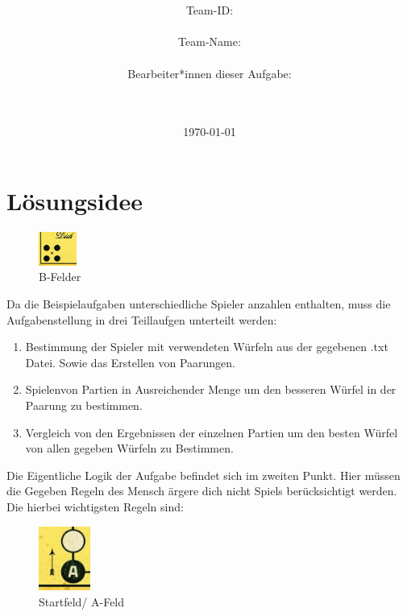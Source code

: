 \documentclass[a4paper,11pt,ngerman]{scrartcl}
\title{\textbf{\Huge\Aufgabe}}
\author{\LARGE Team-ID: \LARGE \TeamId \\\\
	    \LARGE Team-Name: \LARGE \TeamName \\\\
	    \LARGE Bearbeiter*innen dieser Aufgabe: \\ 
	    \LARGE \Namen\\\\}
\date{\LARGE\today}
\begin{document}
\maketitle
\tableofcontents

\vspace{0.5cm}


\section{Lösungsidee}

 \begin{figure} 
 	\centering
 	\includegraphics[width=0.11\textwidth]{home}	 	
 	\caption{B-Felder}
 	\label{fig:B-Felder}
 \end{figure}
Da die Beispielaufgaben unterschiedliche Spieler anzahlen enthalten, muss die Aufgabenstellung in drei
Teillaufgen unterteilt werden:

\begin{enumerate}
	
	\item Bestimmung der Spieler mit verwendeten Würfeln aus der gegebenen .txt Datei. Sowie das Erstellen von Paarungen.
	\item \glqq Spielen\grqq\space von Partien in Ausreichender Menge um den besseren Würfel in der Paarung zu bestimmen.
	\item Vergleich von den Ergebnissen der einzelnen Partien um den besten Würfel von allen gegeben Würfeln zu Bestimmen.	
\end{enumerate}
Die Eigentliche Logik der Aufgabe befindet sich im zweiten Punkt. Hier müssen die Gegeben Regeln des Mensch ärgere dich nicht Spiels berücksichtigt werden. Die hierbei wichtigsten Regeln sind:\\
\begin{figure} 
	\centering
	\includegraphics[width=0.15\textwidth]{start}	
	\caption{Startfeld/ A-Feld}
	\label{fig:Startfeld}
\end{figure}
\end{document}
